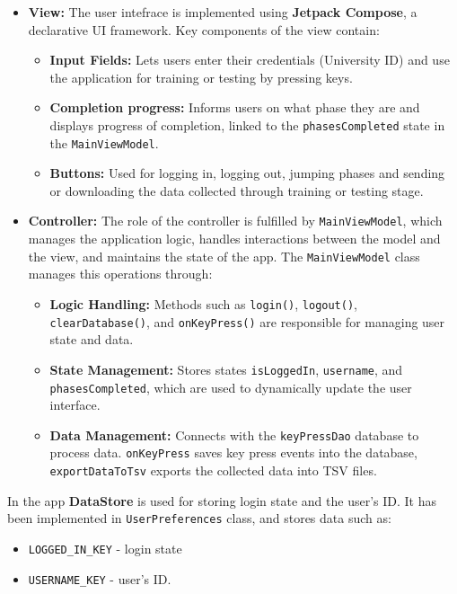 \begin{itemize}
	\item \textbf{View:} The user intefrace is implemented using \textbf{Jetpack Compose}, a declarative UI framework. Key components of the view contain:
	\begin{itemize}
		\item \textbf{Input Fields:} Lets users enter their credentials (University ID) and use the application for training or testing by pressing keys. 
		\item \textbf{Completion progress:} Informs users on what phase they are and displays progress of completion, linked to the \texttt{phasesCompleted} state in the \texttt{MainViewModel}.
		\item \textbf{Buttons:} Used for logging in, logging out, jumping phases and sending or downloading the data collected through training or testing stage.
	\end{itemize}
	\item \textbf{Controller:} The role of the controller is fulfilled by \texttt{MainViewModel}, which manages the application logic, handles interactions between the model and the view, and maintains the state of the app. \newline
	The \texttt{MainViewModel} class manages this operations through:
	\begin{itemize}
		\item \textbf{Logic Handling:} Methods such as \texttt{login()}, \texttt{logout()}, \texttt{clearDatabase()}, and \texttt{onKeyPress()} are responsible for managing user state and data.
		\item \textbf{State Management:} Stores states \texttt{isLoggedIn}, \texttt{username}, and \texttt{phasesCompleted}, which are used to dynamically update the user interface.
		\item \textbf{Data Management:} Connects with the \texttt{keyPressDao} database to process data. \texttt{onKeyPress} saves key press events into the database, \texttt{exportDataToTsv} exports the collected data into TSV files.
	\end{itemize}
\end{itemize}
In the app \textbf{DataStore} is used for storing login state and the user's ID. It has been implemented in \texttt{UserPreferences} class, and stores data such as:
\begin{itemize}
	\item \texttt{LOGGED\_IN\_KEY} - login state
	\item \texttt{USERNAME\_KEY} - user's ID.
\end{itemize}
